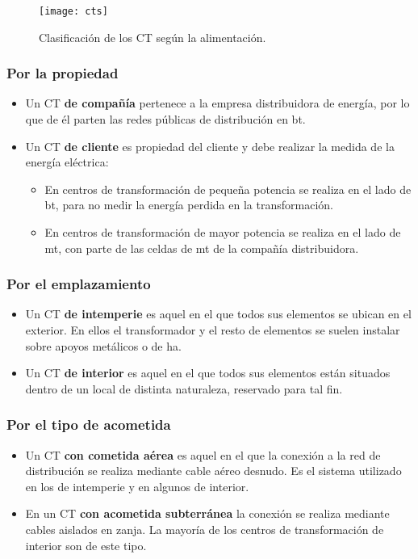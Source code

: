 \begin{figure}
	\centering
	\caption{Clasificación de los CT según la alimentación.}
	\label{fig:cts-alimentacion}
	\texttt{[image: cts]}
\end{figure}

\subsubsection{Por la propiedad}

\begin{itemize}
	\item Un CT \textbf{de compañía} pertenece a la empresa distribuidora de energía, por lo que de él parten las redes públicas de distribución en \acrshort{bt}.
	\item Un CT \textbf{de cliente} es propiedad del cliente y debe realizar la medida de la energía eléctrica:
	\begin{itemize}
		\item En centros de transformación de pequeña potencia se realiza en el lado de \acrshort{bt}, para no medir la energía perdida en la transformación.
		\item En centros de transformación de mayor potencia se realiza en el lado de \acrshort{mt}, con parte de las celdas de \acrshort{mt} de la compañía distribuidora.
	\end{itemize}
\end{itemize}

\subsubsection{Por el emplazamiento}

\begin{itemize}
	\item Un CT \textbf{de intemperie} es aquel en el que todos sus elementos se ubican en el exterior. En ellos el transformador y el resto de elementos se suelen instalar sobre apoyos metálicos o de \acrshort{ha}.
	\item Un CT \textbf{de interior} es aquel en el que todos sus elementos están situados dentro de un local de distinta naturaleza, reservado para tal fin.
\end{itemize}

\subsubsection{Por el tipo de acometida}
\begin{itemize}
	\item Un CT \textbf{con cometida aérea} es aquel en el que la conexión a la red de distribución se realiza mediante cable aéreo desnudo. Es el sistema utilizado en los de intemperie y en algunos de interior.
	\item En un CT \textbf{con acometida subterránea} la conexión se realiza mediante cables aislados en zanja. La mayoría de los centros de transformación de interior son de este tipo.
\end{itemize}

